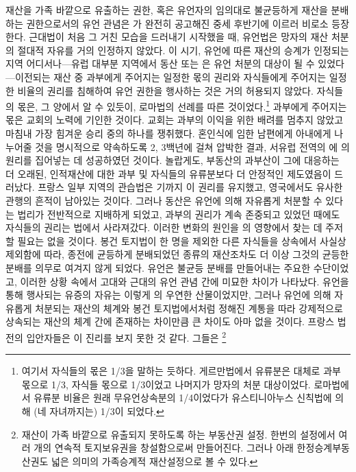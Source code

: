 재산을 가족 바깥으로 유출하는 권한,
혹은
유언자의 임의대로
불균등하게 재산을 분배하는 권한으로서의 유언 관념은
가 완전히 공고해진 중세 후반기에 이르러 비로소 등장한다.
근대법이 처음 그 거친 모습을 드러내기 시작했을 때,
유언법은 망자의 재산 처분의 절대적 자유를 거의 인정하지 않았다.
이 시기, 유언에 따른 재산의 승계가 인정되는 지역 어디서나---유럽
대부분 지역에서 동산 또는 은 유언 처분의 대상이 될 수
있었다---이전되는 재산 중 과부에게 주어지는 일정한 몫의 권리와
자식들에게 주어지는 일정한 비율의 권리를
침해하여 유언 권한을 행사하는 것은 거의 허용되지 않았다.
자식들의 몫은, 그 양에서 알 수 있듯이,
로마법의 선례를 따른 것이었다.\footnote{%
  여기서 자식들의 몫은 1/3을 말하는 듯하다.
  게르만법에서 유류분은 대체로
  과부 몫으로 1/3, 자식들 몫으로 1/3이었고 나머지가
  망자의 처분 대상이었다.
  로마법에서 유류분 비율은 원래 무유언상속분의 1/4이었다가
  유스티니아누스 신칙법에 의해 (네 자녀까지는) 1/3이 되었다.
}
과부에게 주어지는 몫은 교회의 노력에 기인한 것이다.
교회는 과부의 이익을 위한 배려를 멈추지 않았고
마침내 가장 힘겨운 승리 중의 하나를 쟁취했다.
혼인식에 임한
남편에게
아내에게 나누어줄 것을 명시적으로 약속하도록
2, 3백년에 걸쳐
압박한 결과,
서유럽 전역의 에 의 원리를
집어넣는 데 성공하였던 것이다.
놀랍게도, 부동산의 과부산이
그에 대응하는 더 오래된,
인적재산에 대한 과부 및 자식들의 유류분보다
더 안정적인 제도였음이 드러났다.
프랑스 일부 지역의 관습법은 기까지 이 권리를 유지했고,
영국에서도 유사한 관행의 흔적이 남아있는 것이다.
그러나
동산은 유언에 의해 자유롭게 처분할 수 있다는 법리가
전반적으로 지배하게 되었고,
과부의 권리가 계속 존중되고 있었던 때에도
자식들의 권리는 법에서 사라져갔다.
이러한 변화의 원인을 의 영향에서
찾는 데 주저할 필요는 없을 것이다.
봉건 토지법이 한 명을 제외한 다른 자식들을 상속에서 사실상 제외함에 따라,
종전에 균등하게 분배되었던 종류의 재산조차도
더 이상 그것의 균등한 분배를 의무로 여겨지 않게 되었다.
유언은 불균등 분배를 만들어내는 주요한 수단이었고,
이러한 상황 속에서
고대와 근대의 유언 관념 간에 미묘한 차이가 나타났다.
유언을 통해 행사되는 유증의 자유는 이렇게 의 우연한 산물이었지만,
그러나
유언에 의해 자유롭게 처분되는 재산의 체계와
봉건 토지법에서처럼
정해진 계통을 따라 강제적으로 상속되는 재산의 체계
간에 존재하는 차이만큼 큰 차이도 아마 없을 것이다.
프랑스 법전의 입안자들은 이 진리를 보지 못한 것 같다.
그들은
%
\footnote{재산이 가족 바깥으로 유출되지 못하도록 하는 부동산권 설정.
  한번의 설정에서 여러 개의 연속적 토지보유권을 창설함으로써 만들어진다.
  그러나 아래 한정승계부동산권도 넓은 의미의 가족승계적 재산설정으로 볼 수 있다.
}%
